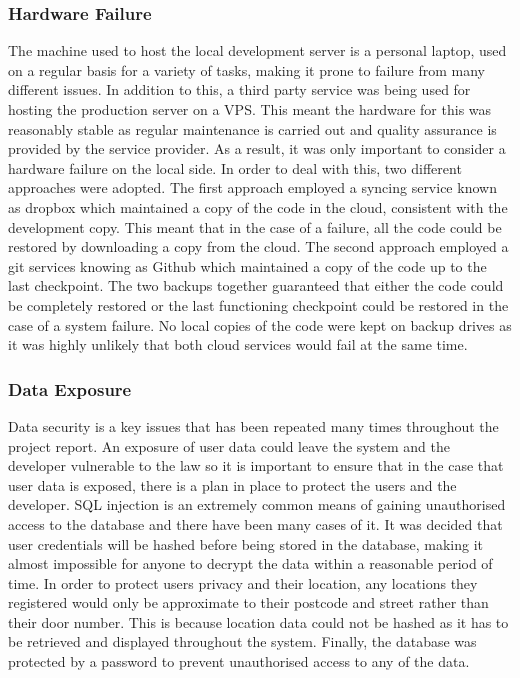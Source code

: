 \subsubsection{Hardware Failure}
The machine used to host the local development server is a personal laptop, used on a regular basis for a variety of tasks, making it prone to failure from many different issues. In addition to this, a third party service was being used for hosting the production server on a VPS. This meant the hardware for this was reasonably stable as regular maintenance is carried out and quality assurance is provided by the service provider. As a result, it was only important to consider a hardware failure on the local side. In order to deal with this, two different approaches were adopted. The first approach employed a syncing service known as dropbox which maintained a copy of the code in the cloud, consistent with the development copy. This meant that in the case of a failure, all the code could be restored by downloading a copy from the cloud. The second approach employed a git services knowing as Github which maintained a copy of the code up to the last checkpoint. The two backups together guaranteed that either the code could be completely restored or the last functioning checkpoint could be restored in the case of a system failure. No local copies of the code were kept on backup drives as it was highly unlikely that both cloud services would fail at the same time.

\subsubsection{Data Exposure}
Data security is a key issues that has been repeated many times throughout the project report. An exposure of user data could leave the system and the developer vulnerable to the law so it is important to ensure that in the case that user data is exposed, there is a plan in place to protect the users and the developer. SQL injection is an extremely common means of gaining unauthorised access to the database and there have been many cases of it. It was decided that user credentials will be hashed before being stored in the database, making it almost impossible for anyone to decrypt the data within a reasonable period of time. In order to protect users privacy and their location, any locations they registered would only be approximate to their postcode and street rather than their door number. This is because location data could not be hashed as it has to be retrieved and displayed throughout the system. Finally, the database was protected by a password to prevent unauthorised access to any of the data.

